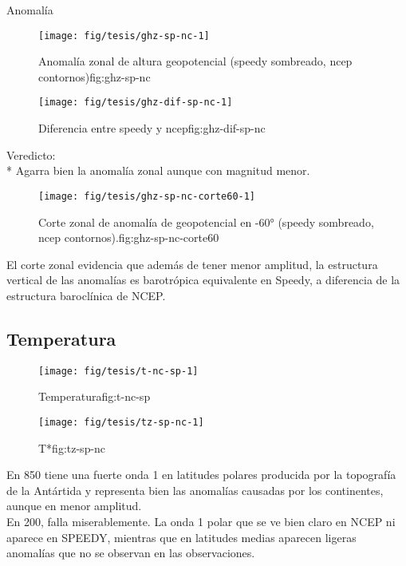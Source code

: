 \documentclass[spanish,a4paper]{book}
\begin{document}
Anomalía

\begin{figure}

{\centering \texttt{[image: fig/tesis/ghz-sp-nc-1]} 

}

\caption{Anomalía zonal de altura geopotencial (speedy sombreado, ncep contornos){fig:ghz-sp-nc}}\label{fig:ghz-sp-nc}
\end{figure}

\begin{figure}

{\centering \texttt{[image: fig/tesis/ghz-dif-sp-nc-1]} 

}

\caption{Diferencia entre speedy y ncep{fig:ghz-dif-sp-nc}}\label{fig:ghz-dif-sp-nc}
\end{figure}

Veredicto:\\
* Agarra bien la anomalía zonal aunque con magnitud menor.

\begin{figure}

{\centering \texttt{[image: fig/tesis/ghz-sp-nc-corte60-1]} 

}

\caption{Corte zonal de anomalía de geopotencial en -60° (speedy sombreado, ncep contornos).{fig:ghz-sp-nc-corte60}}\label{fig:ghz-sp-nc-corte60}
\end{figure}

El corte zonal evidencia que además de tener menor amplitud, la
estructura vertical de las anomalías es barotrópica equivalente en
Speedy, a diferencia de la estructura baroclínica de NCEP.

\subsection{Temperatura}\label{temperatura-1}

\begin{figure}
\texttt{[image: fig/tesis/t-nc-sp-1]} \caption{Temperatura{fig:t-nc-sp}}\label{fig:t-nc-sp}
\end{figure}

\begin{figure}
\texttt{[image: fig/tesis/tz-sp-nc-1]} \caption{T*{fig:tz-sp-nc}}\label{fig:tz-sp-nc}
\end{figure}

En 850 tiene una fuerte onda 1 en latitudes polares producida por la
topografía de la Antártida y representa bien las anomalías causadas por
los continentes, aunque en menor amplitud.\\
En 200, falla miserablemente. La onda 1 polar que se ve bien claro en
NCEP ni aparece en SPEEDY, mientras que en latitudes medias aparecen
ligeras anomalías que no se observan en las observaciones.
\end{document}
